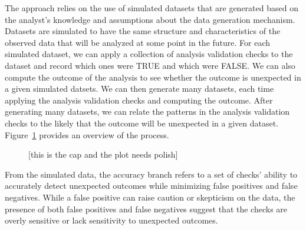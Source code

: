\documentclass[
  12pt,
]{interact}
\begin{document}
The approach relies on the use of simulated datasets that are generated
based on the analyst's knowledge and assumptions about the data
generation mechanism. Datasets are simulated to have the same structure
and characteristics of the observed data that will be analyzed at some
point in the future. For each simulated dataset, we can apply a
collection of analysis validation checks to the dataset and record which
ones were TRUE and which were FALSE. We can also compute the outcome of
the analysis to see whether the outcome is unexpected in a given
simulated datsets. We can then generate many datasets, each time
applying the analysis validation checks and computing the outcome. After
generating many datasets, we can relate the patterns in the analysis
validation checks to the likely that the outcome will be unexpected in a
given dataset. Figure~\ref{fig-metric-calc} provides an overview of the
process.

\label{cell-fig-metric-calc}
\begin{figure}[H]


\caption{\label{fig-metric-calc}{[}this is the cap and the plot needs
polish{]}}

\end{figure}%

From the simulated data, the accuracy branch refers to a set of checks'
ability to accurately detect unexpected outcomes while minimizing false
positives and false negatives. While a false positive can raise caution
or skepticism on the data, the presence of both false positives and
false negatives suggest that the checks are overly sensitive or lack
sensitivity to unexpected outcomes.
\end{document}
